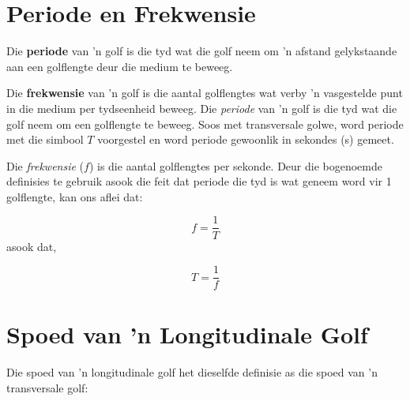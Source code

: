             \section{Periode en Frekwensie}
            \nopagebreak
            \par
{} {  Die \textbf{periode} van 'n golf is die tyd wat die golf neem om 'n afstand gelykstaande aan een golflengte deur die medium te beweeg.     } 
\par
  {   Die \textbf{frekwensie} van 'n golf is die aantal golflengtes wat verby 'n vasgestelde punt in die medium per tydseenheid beweeg.  } 
        \label{m38782*id292523} Die \textsl{periode} van 'n golf is die tyd wat die golf neem om een golflengte te beweeg. Soos met transversale golwe, word periode met die simbool $T$ voorgestel en word periode gewoonlik in sekondes (s) gemeet.\par 
        \label{m38782*id292542} Die \textsl{frekwensie} ($f$) is die aantal golflengtes per sekonde. Deur die bogenoemde definisies te gebruik asook die feit dat periode die tyd is wat geneem word vir 1 golflengte, kan ons aflei dat:\par 
        \label{m38782*id291687}\nopagebreak\noindent{}
          
    \begin{equation*}
    f=\frac{1}{T}
      \end{equation*}
        \label{m38782*id291706}asook dat,\par 
        \label{m38782*id292764}\nopagebreak\noindent{}
    \begin{equation*}
    T=\frac{1}{f}
      \end{equation*}
      \label{m38782*uid11}
            \section{Spoed van 'n Longitudinale Golf}
            \nopagebreak
            \label{m38782*id292794}Die spoed van 'n longitudinale golf het dieselfde definisie as die spoed van 'n transversale golf:\par
%           

